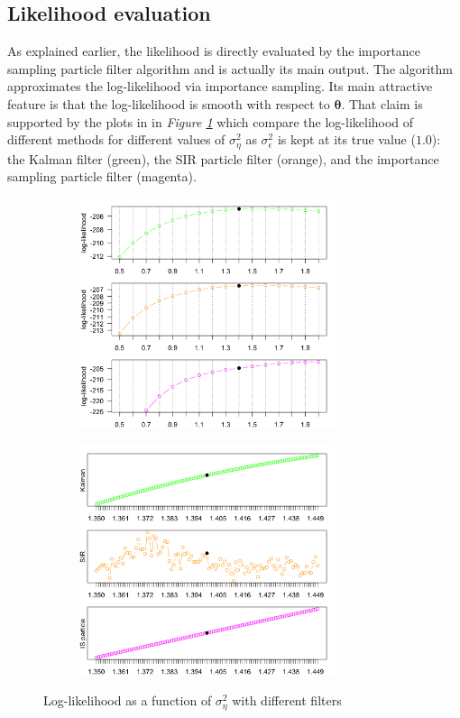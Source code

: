 \documentclass[11pt, oneside]{scrreprt}   	%
\begin{document}
\subsection{Likelihood evaluation}
As explained earlier, the likelihood is directly evaluated by the importance sampling particle filter algorithm and is actually its main output. 
The algorithm approximates the log-likelihood via importance sampling. 
Its main attractive feature is that the log-likelihood is smooth with respect to $\boldsymbol{\theta}$. 
That claim is supported by the plots in in \textit{Figure \ref{fig:ullm_loglik}} which compare the log-likelihood of different methods for different values of $\sigma_{\eta}^2$ as $\sigma_{\epsilon}^2$ is kept at its true value ($1.0$): the Kalman filter (green), the SIR particle filter (orange), and the importance sampling particle filter (magenta).\\ 

\begin{figure}[h!]
\centering
\begin{subfigure}{0.5\textwidth}
  \centering
  \includegraphics[width=75mm]{../../images/ullm-loglik-eta.png}
\end{subfigure}%
\begin{subfigure}{0.5\textwidth}
  \centering
  \includegraphics[width=75mm]{../../images/ullm-loglik-detail.png}
\end{subfigure}
\caption{Log-likelihood as a function of $\sigma_{\eta}^2$ with different filters}
\label{fig:ullm_loglik}
\end{figure}
\end{document}
